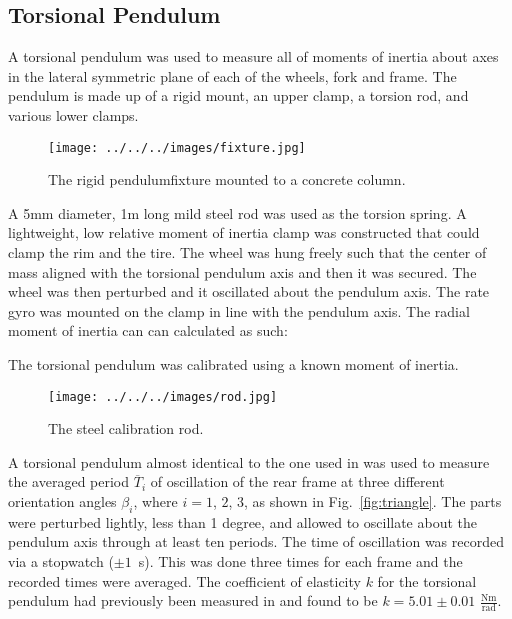\documentclass{bmd2010p}
\begin{document}
\subsection{Torsional Pendulum}
A torsional pendulum was used to measure all of moments of inertia about axes
in the lateral symmetric plane of each of the wheels, fork and frame. The
pendulum is made up of a rigid mount, an upper clamp, a torsion rod, and
various lower clamps.
\begin{figure}[htbp]
    \begin{center}
        \texttt{[image: ../../../images/fixture.jpg]}
    \end{center}
    \caption{The rigid pendulumfixture mounted to a concrete column.}
    \label{fig:fixture}
\end{figure}
A 5mm diameter, 1m long mild steel rod was used as the torsion
spring. A lightweight, low relative moment of inertia clamp was constructed
that could clamp the rim and the tire. The wheel was hung freely such that the
center of mass aligned with the torsional pendulum axis and then it was
secured. The wheel was then perturbed and it oscillated about the pendulum axis.
The rate gyro was mounted on the clamp in line with the pendulum axis. The
radial moment of inertia can can calculated as such:

The torsional pendulum was calibrated using a known moment of inertia. 
\begin{figure}[htbp]
    \begin{center}
        \texttt{[image: ../../../images/rod.jpg]}
    \end{center}
    \caption{The steel calibration rod.}
    \label{fig:rod}
\end{figure}
A torsional pendulum almost identical to the one used in
\cite{Kooijman2006} was used to measure the averaged period $\overline{T}_i$ of
oscillation of the rear frame at three different
orientation angles $\beta_i$, where $i=1$, $2$, $3$, as shown in
Fig.~\ref{fig:triangle}. The parts were perturbed lightly, less than 1 degree,
and allowed to oscillate about the pendulum axis through at least ten periods.
The time of oscillation was recorded via a stopwatch ($\pm1$~s). This was done
three times for each frame and the recorded times were averaged. The
coefficient of elasticity $k$ for the torsional pendulum had previously been
measured in \cite{Kooijman2006} and found to be $k=5.01\pm0.01$
$\frac{\textrm{Nm}}{\textrm{rad}}$.
\end{document}
